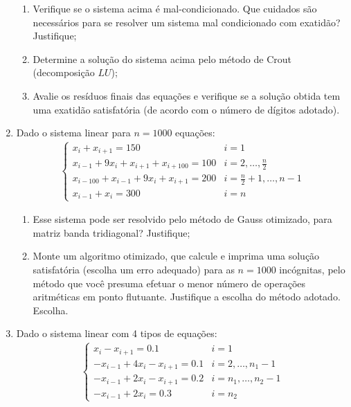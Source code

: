 \documentclass[12pt]{article}
\newenvironment{smallitem}{
    \vspace{-2mm}
    \begin{enumerate}
    \setlength{\parskip}{0pt}
    \setlength{\itemsep}{2pt}
}{
    \vspace{-2mm}
    \end{enumerate}
}
\begin{document}
\begin{enumerate}[label=\textbf{\arabic*})]
\begin{smallitem}

\item Verifique se o sistema acima é mal-condicionado. Que cuidados são
necessários para se resolver um sistema mal condicionado com exatidão?
Justifique;

\item Determine a solução do sistema acima pelo método de Crout (decomposição
$LU$);

\item Avalie os resíduos finais das equações e verifique se a solução obtida
tem uma exatidão satisfatória (de acordo com o número de dígitos adotado).

\end{smallitem}

\item Dado o sistema linear para $n = 1000$ equações:
\begin{align*}
\begin{cases}
x_i + x_{i + 1} = 150 & i = 1 \\
x_{i - 1} + 9x_i + x_{i + 1} + x_{i + 100} = 100 &
i = 2, \dots, \frac{n}{2} \\
x_{i - 100} + x_{i - 1} + 9x_i + x_{i + 1} = 200 &
i = \frac{n}{2} + 1, \dots, n - 1 \\
x_{i - 1} + x_i = 300 & i = n
\end{cases}
\end{align*}

\begin{smallitem}

\item Esse sistema pode ser resolvido pelo método de Gauss otimizado, para
matriz banda tridiagonal? Justifique;

\item Monte um algoritmo otimizado, que calcule e imprima uma solução
satisfatória (escolha um erro adequado) para as $n = 1000$ incógnitas, pelo
método que você presuma efetuar o menor número de operações aritméticas em
ponto flutuante. Justifique a escolha do método adotado. Escolha.

\end{smallitem}

\item Dado o sistema linear com 4 tipos de equações:
\begin{align*}
\begin{cases}
x_i - x_{i + 1} = 0.1 & i = 1 \\
- x_{i - 1} + 4x_i - x_{i + 1} = 0.1 & i = 2, \dots, n_1 - 1 \\
- x_{i - 1} + 2x_i - x_{i + 1} = 0.2 & i = n_1, \dots, n_2 - 1 \\
- x_{i - 1} + 2x_i = 0.3 & i = n_2
\end{cases}
\end{align*}


\end{enumerate}
\end{document}

